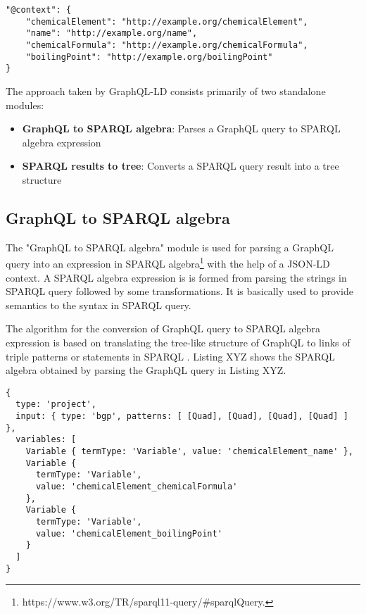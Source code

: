 \begin{minipage}{\linewidth}
\begin{lstlisting}[label=listing:listing7, caption={JSON-LD context}]
"@context": {
	"chemicalElement": "http://example.org/chemicalElement",
	"name": "http://example.org/name",
	"chemicalFormula": "http://example.org/chemicalFormula",
	"boilingPoint": "http://example.org/boilingPoint"
}
\end{lstlisting}
\end{minipage}

The approach taken by GraphQL-LD consists primarily of two standalone modules:
\begin{itemize}
	\item \textbf{GraphQL to SPARQL algebra}: Parses a GraphQL query to SPARQL algebra expression
	\item \textbf{SPARQL results to tree}: Converts a SPARQL query result into a tree structure
\end{itemize}


\subsection{GraphQL to SPARQL algebra}

The "GraphQL to SPARQL algebra" module is used for parsing a GraphQL query into an expression in SPARQL algebra\footnote{https://www.w3.org/TR/sparql11-query/\#sparqlQuery.} with the help of a JSON-LD context. A SPARQL algebra expression is is formed from parsing the strings in SPARQL query followed by some transformations. It is basically used to provide semantics to the syntax in SPARQL query.

The algorithm for the conversion of GraphQL query to SPARQL algebra expression is based on translating the tree-like structure of GraphQL to links of triple patterns or statements  in SPARQL \cite{Taelman2018}. Listing XYZ shows the SPARQL algebra obtained by parsing the GraphQL query in Listing XYZ.

\begin{minipage}{\linewidth}
\begin{lstlisting}[label=listing:listing8, caption={Generated SPARQL Algebra}]
{
  type: 'project',
  input: { type: 'bgp', patterns: [ [Quad], [Quad], [Quad], [Quad] ] },
  variables: [
    Variable { termType: 'Variable', value: 'chemicalElement_name' },
    Variable {
      termType: 'Variable',
      value: 'chemicalElement_chemicalFormula'
    },
    Variable {
      termType: 'Variable',
      value: 'chemicalElement_boilingPoint'
    }
  ]
}

\end{lstlisting}
\end{minipage}

